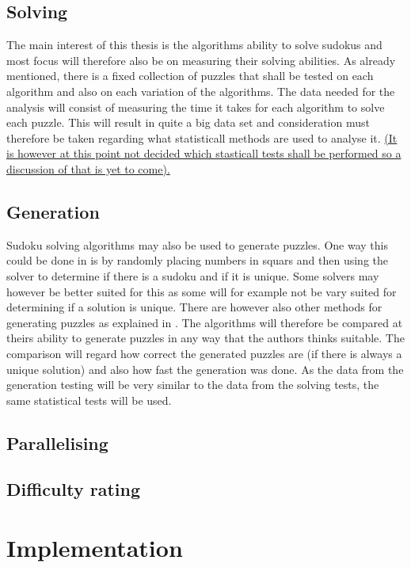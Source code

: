 \documentclass[a4paper,11pt]{kth-mag}
\begin{document}
\subsection{Solving}
The main interest of this thesis is the algorithms ability to solve sudokus and most focus will therefore also be on measuring their solving abilities. As already mentioned, there is a fixed collection of puzzles that shall be tested on each algorithm and also on each variation of the algorithms. The data needed for the analysis will consist of measuring the time it takes for each algorithm to solve each puzzle. This will result in quite a big data set and consideration must therefore be taken regarding what statisticall methods are used to analyse it. 
\underline{(It is however at this point not decided which stasticall tests shall be performed so a discussion of that is yet to come).}

\subsection{Generation}
Sudoku solving algorithms may also be used to generate puzzles. One way this could be done in is by randomly placing numbers in squars and then using the solver to determine if there is a sudoku and if it is unique. Some solvers may however be better suited for this as some will for example not be vary suited for determining if a solution is unique. There are however also other methods for generating puzzles as explained in \cite{generation}. The algorithms will therefore be compared at theirs ability to generate puzzles in any way that the authors thinks suitable. The comparison will regard how correct the generated puzzles are (if there is always a unique solution) and also how fast the generation was done. As the data from the generation testing will be very similar to the data from the solving tests, the same statistical tests will be used.

\subsection{Parallelising}

\subsection{Difficulty rating}

\section{Implementation}
\end{document}
